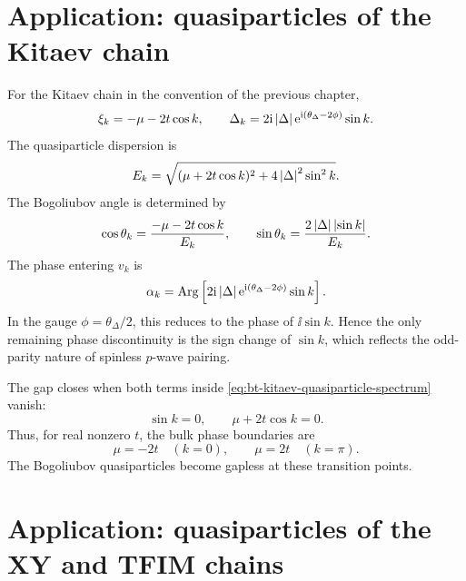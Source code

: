 \section{Application: quasiparticles of the Kitaev chain}
\label{sec:bt-kitaev-quasiparticles}

For the Kitaev chain in the convention of the previous chapter,
\begin{equation}
\label{eq:bt-kitaev-xi-delta}
    \xi_k=-\mu-2t\cos k,
    \qquad
    \Delta_k=2\mathrm{i}\left|\Delta\right|\mathrm{e}^{\mathrm{i}(\theta_\Delta-2\phi)}\sin k.
\end{equation}
The quasiparticle dispersion is
\begin{equation}
\label{eq:bt-kitaev-quasiparticle-spectrum}
    E_k=
    \sqrt{(\mu+2t\cos k)^2+4\left|\Delta\right|^2\sin^2 k}.
\end{equation}
The Bogoliubov angle is determined by
\begin{equation}
\label{eq:bt-kitaev-angle}
    \cos\theta_k=\frac{-\mu-2t\cos k}{E_k},
    \qquad
    \sin\theta_k=\frac{2\left|\Delta\right|\left|\sin k\right|}{E_k}.
\end{equation}
The phase entering $v_k$ is
\begin{equation}
\label{eq:bt-kitaev-alpha}
    \alpha_k
    =
    \operatorname{Arg}\left[
        2\mathrm{i}\left|\Delta\right|\mathrm{e}^{\mathrm{i}(\theta_\Delta-2\phi)}\sin k
    \right].
\end{equation}
In the gauge $\phi=\theta_\Delta/2$, this reduces to the phase of
$\ii\sin k$.  Hence the only remaining phase discontinuity is the sign change of
$\sin k$, which reflects the odd-parity nature of spinless $p$-wave pairing.

The gap closes when both terms inside \cref{eq:bt-kitaev-quasiparticle-spectrum}
vanish:
\begin{equation}
    \sin k=0,
    \qquad
    \mu+2t\cos k=0.
\end{equation}
Thus, for real nonzero $t$, the bulk phase boundaries are
\begin{equation}
    \mu=-2t
    \quad(k=0),
    \qquad
    \mu=2t
    \quad(k=\pi).
\end{equation}
The Bogoliubov quasiparticles become gapless at these transition points.

\section{Application: quasiparticles of the XY and TFIM chains}
\label{sec:bt-xy-tfim-quasiparticles}


